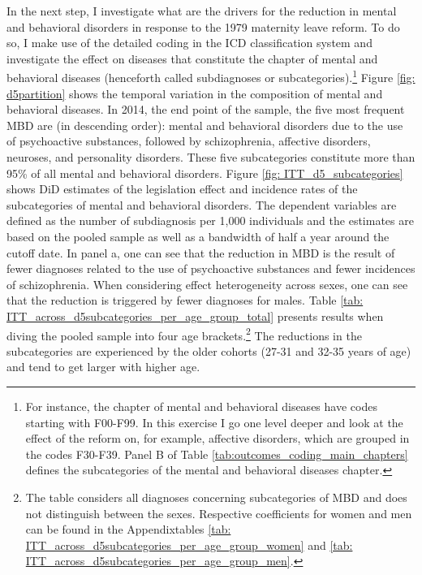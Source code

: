 \documentclass[11pt, a4paper,draft]{article} %
\begin{document}
In the next step, I investigate what are the drivers for the reduction in mental and behavioral disorders in response to the 1979 maternity leave reform. To do so, I make use of the detailed coding in the ICD classification system and investigate the effect on diseases that constitute the chapter of mental and behavioral diseases (henceforth called subdiagnoses or subcategories).\footnote{For instance, the chapter of mental and behavioral diseases have codes starting with F00-F99. In this exercise I go one level deeper and look at the effect of the reform on, for example, affective disorders, which are grouped in the codes F30-F39. Panel B of Table \ref{tab:outcomes_coding_main_chapters} defines the subcategories of the mental and behavioral diseases chapter.} Figure \ref{fig: d5partition} shows the temporal variation in the composition of mental and behavioral diseases. In 2014, the end point of the sample, the five most frequent MBD are (in descending order): mental and behavioral disorders due to the use of psychoactive substances, followed by schizophrenia, affective disorders, neuroses, and personality disorders. These five subcategories constitute more than 95\% of all mental and behavioral disorders. Figure \ref{fig: ITT_d5_subcategories} shows DiD estimates of the legislation effect and incidence rates of the subcategories of mental and behavioral disorders. The dependent variables are defined as the number of subdiagnosis per 1,000 individuals and the estimates are based on the pooled sample as well as a bandwidth of half a year around the cutoff date. In panel a, one can see that the reduction in MBD is the result of fewer diagnoses related to the use of psychoactive substances and fewer incidences of schizophrenia. When considering effect heterogeneity across sexes, one can see that the reduction is triggered by fewer diagnoses for males. Table \ref{tab: ITT_across_d5subcategories_per_age_group_total} presents results when diving the pooled sample into four age brackets.\footnote{The table considers all diagnoses concerning subcategories of MBD and does not distinguish between the sexes. Respective coefficients for women and men can be found in the Appendixtables \ref{tab: ITT_across_d5subcategories_per_age_group_women} and \ref{tab: ITT_across_d5subcategories_per_age_group_men}.} The reductions in the subcategories are experienced by the older cohorts (27-31 and 32-35 years of age) and tend to get larger with higher age. 



\end{document}
